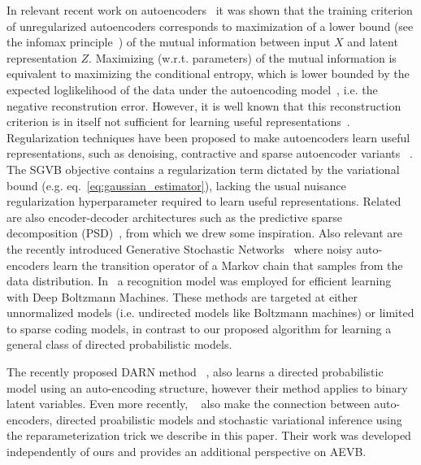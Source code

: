 \documentclass{article} %
\theoremstyle{definition}
\theoremstyle{definition}
\begin{document}
In relevant recent work on autoencoders~\cite{vincent2010stacked} it was shown that the training criterion of unregularized autoencoders corresponds to maximization of a lower bound (see the infomax principle~\cite{linsker1989application}) of the mutual information between input $X$ and latent representation $Z$. Maximizing (w.r.t. parameters) of the mutual information is equivalent to maximizing the conditional entropy, which is lower bounded by the expected loglikelihood of the data under the autoencoding model~\cite{vincent2010stacked}, i.e. the negative reconstrution error.
%
However, it is well known that this reconstruction criterion is in itself not sufficient for learning useful representations~\cite{bengio2013representation}.
%
Regularization techniques have been proposed to make autoencoders learn useful representations, such as  denoising, contractive and sparse autoencoder variants~ \cite{bengio2013representation}. The SGVB objective contains a regularization term dictated by the variational bound (e.g. eq.~\eqref{eq:gaussian_estimator}), lacking the usual nuisance regularization hyperparameter required to learn useful representations.
Related are also encoder-decoder architectures such as the predictive sparse decomposition (PSD)~\cite{koray-psd-08}, from which we drew some inspiration. Also relevant are the recently introduced Generative Stochastic Networks~\cite{bengio2013deep} where noisy auto-encoders learn the transition operator of a Markov chain that samples from the data distribution. In~\cite{salakhutdinov2010efficient} a recognition model was employed for efficient learning with Deep Boltzmann Machines.
These methods are targeted at either unnormalized models (i.e. undirected models like Boltzmann machines) or limited to sparse coding models, in contrast to our proposed algorithm for learning a general class of directed probabilistic models.

The recently proposed DARN method ~\cite{gregor2013deep}, also learns a directed probabilistic model using an auto-encoding structure, however their method applies to binary latent variables. 
Even more recently, ~\cite{rezende2014stochastic} also make the connection between auto-encoders, directed proabilistic models and stochastic variational inference using the reparameterization trick we describe in this paper. Their work was developed independently of ours and provides an additional perspective on AEVB.



%

%
%
%
%
\end{document}
